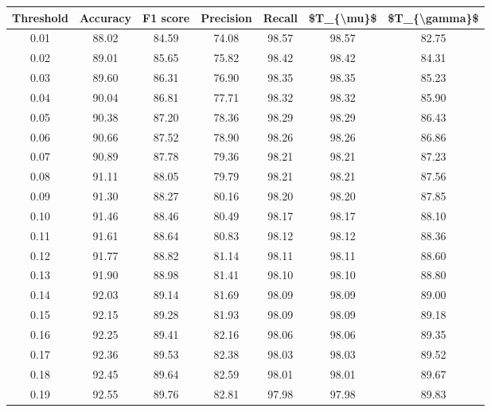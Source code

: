 \begin{tabular}{|c|c|c|c|c|c|c|}
\hline
 Threshold &  Accuracy &  F1 score &  Precision &  Recall &  \$T\_\{\textbackslash mu\}\$ &  \$T\_\{\textbackslash gamma\}\$ \\
\hline
      0.01 &     88.02 &     84.59 &      74.08 &   98.57 &      98.57 &         82.75 \\
      0.02 &     89.01 &     85.65 &      75.82 &   98.42 &      98.42 &         84.31 \\
      0.03 &     89.60 &     86.31 &      76.90 &   98.35 &      98.35 &         85.23 \\
      0.04 &     90.04 &     86.81 &      77.71 &   98.32 &      98.32 &         85.90 \\
      0.05 &     90.38 &     87.20 &      78.36 &   98.29 &      98.29 &         86.43 \\
      0.06 &     90.66 &     87.52 &      78.90 &   98.26 &      98.26 &         86.86 \\
      0.07 &     90.89 &     87.78 &      79.36 &   98.21 &      98.21 &         87.23 \\
      0.08 &     91.11 &     88.05 &      79.79 &   98.21 &      98.21 &         87.56 \\
      0.09 &     91.30 &     88.27 &      80.16 &   98.20 &      98.20 &         87.85 \\
      0.10 &     91.46 &     88.46 &      80.49 &   98.17 &      98.17 &         88.10 \\
      0.11 &     91.61 &     88.64 &      80.83 &   98.12 &      98.12 &         88.36 \\
      0.12 &     91.77 &     88.82 &      81.14 &   98.11 &      98.11 &         88.60 \\
      0.13 &     91.90 &     88.98 &      81.41 &   98.10 &      98.10 &         88.80 \\
      0.14 &     92.03 &     89.14 &      81.69 &   98.09 &      98.09 &         89.00 \\
      0.15 &     92.15 &     89.28 &      81.93 &   98.09 &      98.09 &         89.18 \\
      0.16 &     92.25 &     89.41 &      82.16 &   98.06 &      98.06 &         89.35 \\
      0.17 &     92.36 &     89.53 &      82.38 &   98.03 &      98.03 &         89.52 \\
      0.18 &     92.45 &     89.64 &      82.59 &   98.01 &      98.01 &         89.67 \\
      0.19 &     92.55 &     89.76 &      82.81 &   97.98 &      97.98 &         89.83 \\

\end{tabular}
